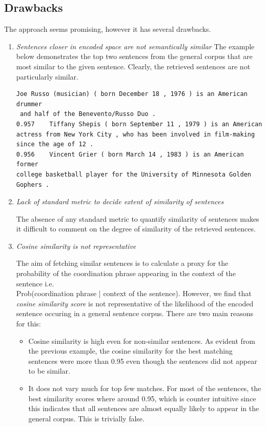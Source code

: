     \subsection{Drawbacks}

        The approach seems promising, however it has several drawbacks.
        \begin{enumerate}
            \item \emph{Sentences closer in encoded space are not semantically similar}
            The example below demonstrates the top two sentences from the general corpus that are most similar to the given sentence. Clearly, the retrieved sentences are not particularly similar.

            \begin{verbatim}
Joe Russo (musician) ( born December 18 , 1976 ) is an American drummer
 and half of the Benevento/Russo Duo .
0.957    Tiffany Shepis ( born September 11 , 1979 ) is an American
actress from New York City , who has been involved in film-making 
since the age of 12 .
0.956    Vincent Grier ( born March 14 , 1983 ) is an American former 
college basketball player for the University of Minnesota Golden Gophers .
            \end{verbatim}
            
            \item \emph{Lack of standard metric to decide extent of similarity of sentences}
            
            The absence of any standard metric to quantify similarity of sentences makes it difficult to comment on the degree of similarity of the retrieved sentences.

            \item \emph{Cosine similarity is not representative}
            
            The aim of fetching similar sentences is to calculate a proxy for the probability of the coordination phrase appearing in the context of the sentence i.e. \\Prob(coordination phrase | context of the sentence). However, we find that \emph{cosine similarity score} is not representative of the likelihood of the encoded sentence occuring in a general sentence corpus. There are two main reasons for this:
            \begin{itemize}
                \item Cosine similarity is high even for non-similar sentences. As evident from the previous example, the cosine similarity for the best matching sentences were more than 0.95 even though the sentences did not appear to be similar.
                
                \item It does not vary much for top few matches. For most of the sentences, the best similarity scores where around 0.95, which is counter intuitive since this indicates that all sentences are almost equally likely to appear in the general corpus. This is trivially false.
            \end{itemize}
            
        \end{enumerate}

